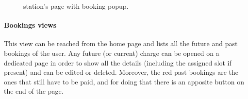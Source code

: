 \begin{figure}[h!]
\begin{minipage}{0.49\textwidth}
        \caption{station's page with booking popup.}
    \end{minipage}
\end{figure}

\pagebreak

\paragraph{Bookings views} This view can be reached from the home page and lists all the future and past bookings of the user. Any future (or current) charge can be opened on a dedicated page in order to show all the details (including the assigned slot if present) and can be edited or deleted. Moreover, the red past bookings are the ones that still have to be paid, and for doing that there is an apposite button on the end of the page.

